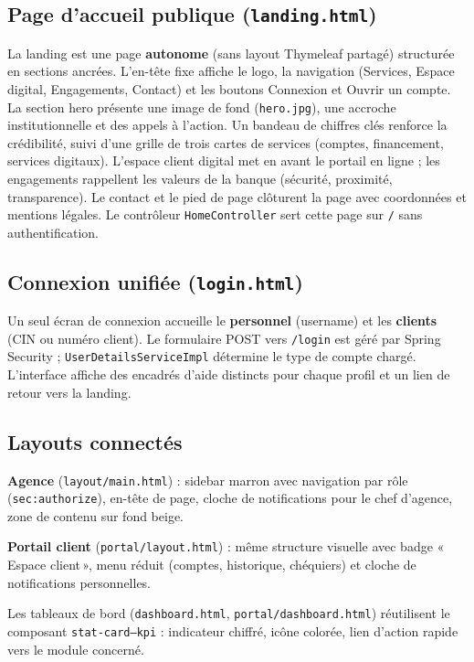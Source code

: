\documentclass[11pt,a4paper,oneside]{report}
\begin{document}
\subsection{Page d'accueil publique (\texttt{landing.html})}

La landing est une page \textbf{autonome} (sans layout Thymeleaf partagé) structurée en sections ancrées. L'en-tête fixe affiche le logo, la navigation (Services, Espace digital, Engagements, Contact) et les boutons Connexion et Ouvrir un compte. La section hero présente une image de fond (\texttt{hero.jpg}), une accroche institutionnelle et des appels à l'action. Un bandeau de chiffres clés renforce la crédibilité, suivi d'une grille de trois cartes de services (comptes, financement, services digitaux). L'espace client digital met en avant le portail en ligne ; les engagements rappellent les valeurs de la banque (sécurité, proximité, transparence). Le contact et le pied de page clôturent la page avec coordonnées et mentions légales. Le contrôleur \texttt{HomeController} sert cette page sur \texttt{/} sans authentification.

\subsection{Connexion unifiée (\texttt{login.html})}

Un seul écran de connexion accueille le \textbf{personnel} (username) et les \textbf{clients} (CIN ou numéro client). Le formulaire POST vers \texttt{/login} est géré par Spring Security ; \texttt{UserDetailsServiceImpl} détermine le type de compte chargé. L'interface affiche des encadrés d'aide distincts pour chaque profil et un lien de retour vers la landing.

\subsection{Layouts connectés}

\textbf{Agence} (\texttt{layout/main.html}) : sidebar marron avec navigation par rôle (\texttt{sec:authorize}), en-tête de page, cloche de notifications pour le chef d'agence, zone de contenu sur fond beige.

\textbf{Portail client} (\texttt{portal/layout.html}) : même structure visuelle avec badge «\,Espace client\,», menu réduit (comptes, historique, chéquiers) et cloche de notifications personnelles.

Les tableaux de bord (\texttt{dashboard.html}, \texttt{portal/dashboard.html}) réutilisent le composant \texttt{stat-card--kpi} : indicateur chiffré, icône colorée, lien d'action rapide vers le module concerné.
\end{document}
